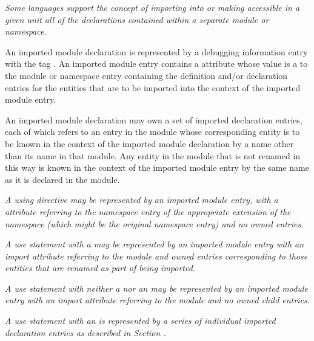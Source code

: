 \textit{Some languages support the concept of importing into or making
accessible in a given unit all of the declarations contained
within a separate module or namespace.
}

An imported module declaration is represented by a debugging
information entry with 
the 
tag \DWTAGimportedmoduleTARG.
An
imported module entry contains a 
\DWATimport{} attribute
whose value is a  
to the module or namespace entry
containing the definition and/or declaration entries for
the entities that are to be imported into the context of the
imported module entry.

An imported module declaration may own a set of imported
declaration entries, each of which refers to an entry in the
module whose corresponding entity is to be known in the context
of the imported module declaration by a name other than its
name in that module. Any entity in the module that is not
renamed in this way is known in the context of the imported
module entry by the same name as it is declared in the module.

\textit{A  using directive
may be represented by an imported 
module\hypertarget{chap:DWATimportnamespaceusingdirective}{}
entry, with a \DWATimportDEFN{} attribute referring to the namespace
entry of the appropriate extension of the namespace (which
might be the original namespace entry) and no owned entries.
}

\textit{A  use statement 
with a  may be
represented by an imported module entry with an import
attribute referring to the module and owned entries
corresponding to those entities that are renamed as part of
being imported.
}

\textit{A  use statement
with neither a  nor
an  may be represented by an imported module
entry with an import attribute referring to the module and
no owned child entries.
}

\textit{A use statement with an  is represented by a
series of individual imported declaration entries as described
in Section .
}

